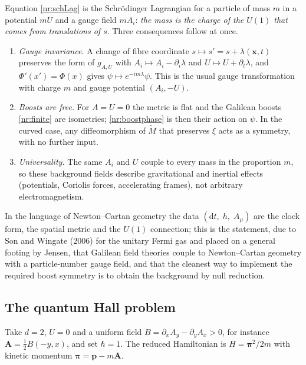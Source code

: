 Equation \eqref{nr:schLag} is the Schr\"odinger Lagrangian for a particle of
mass $m$ in a potential $mU$ and a gauge field $mA_i$: \emph{the mass is the
charge of the $U(1)$ that comes from translations of $s$}. Three consequences
follow at once.
\begin{enumerate}
\item \emph{Gauge invariance.} A change of fibre coordinate
$s\mapsto s'=s+\lambda(\mathbf{x},t)$ preserves the form of $g_{A,U}$ with
$A_i\mapsto A_i-\partial_i\lambda$ and $U\mapsto U+\partial_t\lambda$, and
$\Phi'(x')=\Phi(x)$ gives $\psi\mapsto e^{-im\lambda}\psi$. This is the usual
gauge transformation with charge $m$ and gauge potential $(A_i,-U)$.
\item \emph{Boosts are free.} For $A=U=0$ the metric is flat and the
Galilean boosts \eqref{nr:finite} are isometries; \eqref{nr:boostphase}
is then their action on $\psi$. In the curved case, any diffeomorphism of
$\tilde M$ that preserves $\xi$ acts as a symmetry, with no further input.
\item \emph{Universality.} The same $A_i$ and $U$ couple to every mass in
the proportion $m$, so these background fields describe gravitational and
inertial effects (potentials, Coriolis forces, accelerating frames), not
arbitrary electromagnetism.
\end{enumerate}
In the language of Newton--Cartan geometry the data $(\mathrm{d}t,\;h,\;A_\mu)$
are the clock form, the spatial metric and the $U(1)$ connection; this is the
statement, due to Son and Wingate (2006) for the unitary Fermi gas and
placed on a general footing by Jensen, that Galilean field theories couple to
Newton--Cartan geometry with a particle-number gauge field, and that
the cleanest way to implement the required boost symmetry is to obtain the
background by null reduction.

\subsection{The quantum Hall problem}
\label{sec:nr-qhe}

Take $d=2$, $U=0$ and a uniform field $B=\partial_xA_y-\partial_yA_x>0$, for instance
$\mathbf{A}=\tfrac12B(-y,x)$, and set $\hbar=1$. The reduced Hamiltonian is
$H=\boldsymbol{\pi}^2/2m$ with kinetic momentum $\boldsymbol{\pi}=\mathbf{p}-m\mathbf{A}$.

